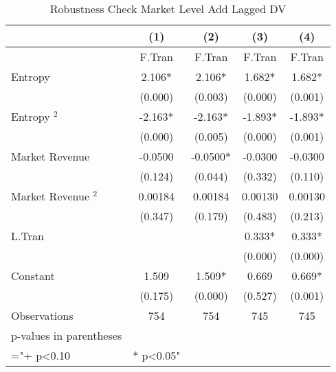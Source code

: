 \begin{table}
\centering
\begin{tabular}{@{}lcccc@{}}
\toprule
 & (1) & (2) & (3) & (4) \\ \midrule
 & F.Tran & F.Tran & F.Tran & F.Tran \\
Entropy & 2.106* & 2.106* & 1.682* & 1.682* \\
 & (0.000) & (0.003) & (0.000) & (0.001) \\
Entropy $^2$ & -2.163* & -2.163* & -1.893* & -1.893* \\
 & (0.000) & (0.005) & (0.000) & (0.001) \\
Market Revenue & -0.0500 & -0.0500* & -0.0300 & -0.0300 \\
 & (0.124) & (0.044) & (0.332) & (0.110) \\
Market Revenue $^2$ & 0.00184 & 0.00184 & 0.00130 & 0.00130 \\
 & (0.347) & (0.179) & (0.483) & (0.213) \\
L.Tran &  &  & 0.333* & 0.333* \\
 &  &  & (0.000) & (0.000) \\
Constant & 1.509 & 1.509* & 0.669 & 0.669* \\
 & (0.175) & (0.000) & (0.527) & (0.001) \\
Observations & 754 & 754 & 745 & 745 \\
p-values in parentheses &  &  &  &  \\
="+ p\textless{}0.10 & * p\textless{}0.05" &  &  &  \\ \bottomrule
\end{tabular}
\caption{Robustness Check Market Level Add Lagged DV}
\label{rob_addlag_mkt}
\end{table}